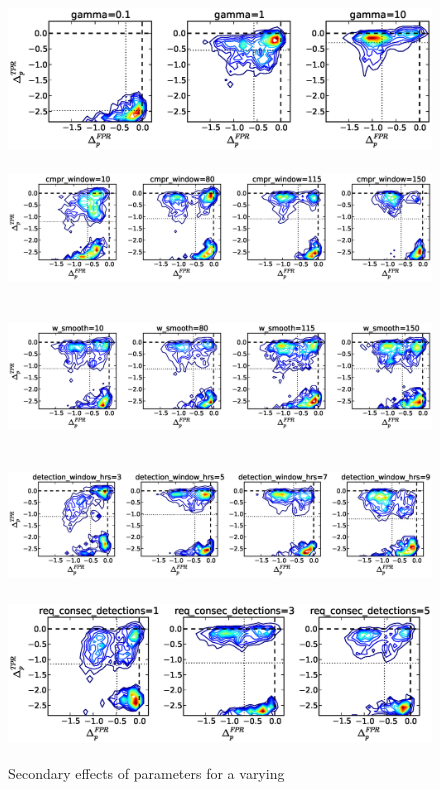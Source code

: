 \begin{figure}[!h]
\begin{center}
\includegraphics[height=1.5in]{../fig/final/delta_hist_sec/threshold/gamma}
\includegraphics[height=1.5in]{../fig/final/delta_hist_sec/threshold/cmpr_window}
\includegraphics[height=1.5in]{../fig/final/delta_hist_sec/threshold/w_smooth}
\includegraphics[height=1.5in]{../fig/final/delta_hist_sec/threshold/detection_window_hrs}
\includegraphics[height=1.5in]{../fig/final/delta_hist_sec/threshold/req_consec_detections}
\end{center}
\caption{\label{fig:delta_sec3} Secondary effects of parameters for a varying }
\end{figure}

